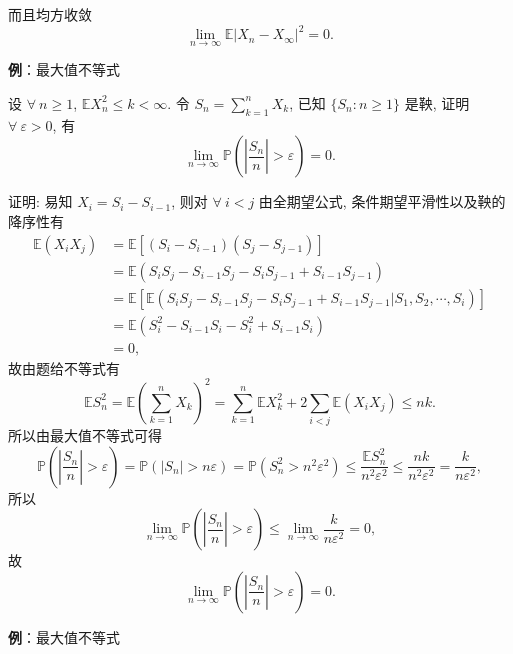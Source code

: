 \documentclass[openany]{ctexbook}
\theoremstyle{kaiti}
\theoremstyle{normal}
\begin{document}
而且均方收敛
\begin{equation}
  \lim_{n\to\infty}\mathbb{E}|X_n-X_\infty|^2=0.
\end{equation}

\textbf{例}：最大值不等式

设 $\forall~n\geqslant1$, $\mathbb{E}X_n^2\leqslant k<\infty$. 令 $S_n=\sum_{k=1}^nX_k$, 已知 $\{S_n:n\geqslant1\}$ 是鞅, 证明 $\forall~\varepsilon>0$, 有
\begin{equation}
  \lim_{n\to\infty}\mathbb{P}\left(\left|\frac{S_n}{n}\right|>\varepsilon\right)=0.
\end{equation}

证明: 易知 $X_i=S_i-S_{i-1}$, 则对 $\forall~i< j$ 由全期望公式, 条件期望平滑性以及鞅的降序性有
\begin{equation}
  \begin{aligned}
    \mathbb{E}(X_iX_j)
    &=\mathbb{E}[(S_i-S_{i-1})(S_j-S_{j-1})]\\
    &=\mathbb{E}(S_iS_j-S_{i-1}S_j-S_iS_{j-1}+S_{i-1}S_{j-1})\\
    &=\mathbb{E}[\mathbb{E}(S_iS_j-S_{i-1}S_j-S_iS_{j-1}+S_{i-1}S_{j-1}|S_1,S_2,\cdots,S_i)]\\
    &=\mathbb{E}(S_i^2-S_{i-1}S_i-S_i^2+S_{i-1}S_i)\\
    &=0,
  \end{aligned}
\end{equation}
故由题给不等式有
\begin{equation}
  \mathbb{E}S_n^2=\mathbb{E}\left(\sum_{k=1}^nX_k\right)^2=\sum_{k=1}^n\mathbb{E}X_k^2+2\sum_{i< j}\mathbb{E}(X_iX_j)\leqslant nk.
\end{equation}
所以由最大值不等式可得
\begin{equation}
  \mathbb{P}\left(\left|\frac{S_n}{n}\right|>\varepsilon\right)=\mathbb{P}(|S_n|>n\varepsilon)=\mathbb{P}\left(S_n^2>n^2\varepsilon^2\right)\leqslant\frac{\mathbb{E}S_n^2}{n^2\varepsilon^2}\leqslant\frac{nk}{n^2\varepsilon^2}=\frac{k}{n\varepsilon^2},
\end{equation}
所以
\begin{equation}
  \lim_{n\to\infty}\mathbb{P}\left(\left|\frac{S_n}{n}\right|>\varepsilon\right)\leqslant\lim_{n\to\infty}\frac{k}{n\varepsilon^2}=0,
\end{equation}
故
\begin{equation}
  \lim_{n\to\infty}\mathbb{P}\left(\left|\frac{S_n}{n}\right|>\varepsilon\right)=0.
\end{equation}

\textbf{例}：最大值不等式
\end{document}
